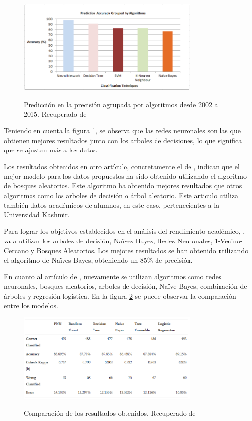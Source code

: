 \begin{figure}[htb]
	\centering
	\caption{Predicción en la precisión agrupada por algoritmos desde 2002 a 2015. Recuperado de \protect{}}
	\includegraphics[width=0.8\textwidth]{recursos/PrecisionMetodos}
	\label{fig:precMet}
\end{figure}

Teniendo en cuenta la figura \ref{fig:precMet}, se observa que las redes neuronales son las que obtienen mejores resultados junto con los arboles de decisiones, lo que significa que se ajustan más a los datos. 

Los resultados obtenidos en otro artículo, concretamente el de , indican que el mejor modelo para los datos propuestos ha sido obtenido utilizando el algoritmo de bosques aleatorios. Este algoritmo ha obtenido mejores resultados que otros algoritmos como los arboles de decisión o árbol aleatorio. Este articulo utiliza también datos académicos de alumnos, en este caso, pertenecientes a la Universidad Kashmir.

Para lograr los objetivos establecidos en el análisis del rendimiento académico, , va a utilizar los arboles de decisión, Naïves Bayes, Redes Neuronales, 1-Vecino-Cercano y Bosques Aleatorios. Los mejores resultados se han obtenido utilizando el algoritmo de Naïves Bayes, obteniendo un 85\% de precisión.

En cuanto al artículo de , nuevamente se utilizan algoritmos como redes neuronales, bosques aleatorios, arboles de decisión, Naïve Bayes, combinación de árboles y regresión logística. En la figura \ref{fig:compResMod} se puede observar la comparación entre los modelos.

\begin{figure}[htb]
	\centering
	\caption{Comparación de los resultados obtenidos. Recuperado de \protect{}}
	\includegraphics[width=0.8\textwidth]{recursos/ComparacionModelos}
	\label{fig:compResMod}
\end{figure}
\FloatBarrier


